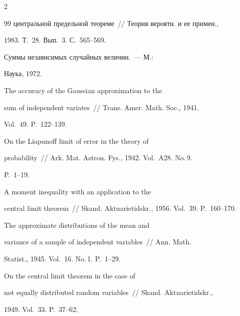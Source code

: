 \begin{multicols}{2}
{{\begin{thebibliography}{99}
центральной предельной теореме~// Теория вероятн. и ее примен.,


1983. Т.~28. Вып.~3. С.~565--569.







 Суммы независимых случайных величин.~--- М.:


Наука, 1972.







 The accuracy of the Gaussian approximation to the


sum of independent variates~// Trans. Amer. Math. Soc., 1941.


Vol.~49. P.~122--139.







 On the Liapunoff limit of error in the theory of


probability~// Ark. Mat. Astron. Fys., 1942. Vol.~A28. No.\,9.


P.~1--19.







 A moment inequality with an application to the


central limit theorem~// Skand. Aktuarietidskr., 1956. Vol.~39. P.~160--170.







 The approximate distributions of the mean and


variance of a sample of independent variables~// Ann. Math.


Statist., 1945. Vol.~16. No.\,1. P.~1--29.







 On the central limit theorem in the case of


not equally distributed random variables~// Skand. Aktuarietidskr.,


1949. Vol.~33. P.~37--62.






\end{thebibliography}}}
\end{multicols}
